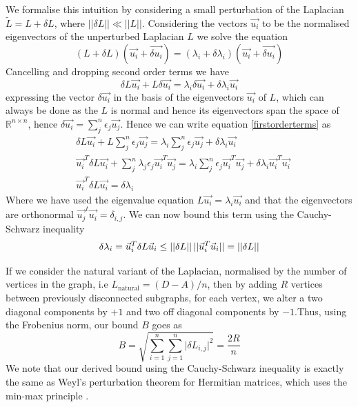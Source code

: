 \documentclass[letterpaper]{article} %
\begin{document}
We formalise this intuition by considering a small perturbation of the Laplacian $\tilde{L} = L +\delta L$, where $|| \delta L|| \ll ||L||$. Considering the vectors $\vec{u_{i}}$ to be the normalised eigenvectors of the unperturbed Laplacian $L$ we solve the equation
\begin{equation}
(L+\delta L)(\vec{u_{i}}+\vec{\delta u_{i}}) = (\lambda_{i}+\delta\lambda_{i})(\vec{u_{i}}+\vec{\delta u_{i}})
\end{equation}
Cancelling and dropping second order terms we have
\begin{equation}
\label{firstorderterms}
\delta L \vec{u_{i}} + L\delta\vec{u_{i}}= \lambda_{i}\delta\vec{u_{i}} + \delta \lambda_{i}\vec{u_{i}}
\end{equation}
expressing the vector $\delta\vec{u_{i}}$ in the basis of the eigenvectors $\vec{u_{i}}$ of $L$, which can always be done as the $L$ is normal and hence its eigenvectors span the space of $\mathbb{R}^{n \times n}$, hence $\delta\vec{u_{i}} = \sum_{j}^{n}\epsilon_{j}\vec{u_{j}}$. Hence we can write equation \eqref{firstorderterms} as 
\begin{align}
& \delta L \vec{u_{i}} + L\sum_{j}^{n}\epsilon_{j}\vec{u_{j}}= \lambda_{i}\sum_{j}^{n}\epsilon_{j}\vec{u_{j}} + \delta \lambda_{i}\vec{u_{i}} \nonumber\\ 
& \vec{u_{i}}^{T}\delta L \vec{u_{i}} + \sum_{j}^{n}\lambda_{j}\epsilon_{j}\vec{u_{i}}^{T}\vec{u_{j}}= \lambda_{i}\sum_{j}^{n}\epsilon_{j}\vec{u_{i}}^{T}\vec{u_{j}} + \delta \lambda_{i}\vec{u_{i}}^{T}\vec{u_{i}}\nonumber\\
& \vec{u_{i}}^{T} \delta L \vec{u_{i}} = \delta \lambda_{i}
\end{align}
Where we have used the eigenvalue equation $L\vec{u_{i}} = \lambda_{i}\vec{u_{i}}$ and that the eigenvectors are orthonormal $\vec{u_{j}}^{t}\vec{u_{i}} = \delta_{i,j}$. We can now bound this term using the Cauchy-Schwarz inequality
\begin{equation}
\label{cauchyschwarz}
\delta \lambda_{i} =  \vec{u}_{i}^{T}\delta L \vec{u}_{i} \leq ||\delta L||\thinspace|| \vec{u}_{i}^{T}\vec{u}_{i}|| = ||\delta L||
\end{equation}

If we consider the natural variant of the Laplacian, normalised by the number of vertices in the graph, i.e $L_\mathrm{natural} = (D-A)/n$, then by adding $R$ vertices between previously disconnected subgraphs, for each vertex, we alter a two diagonal components by $+1$ and two off diagonal components by $-1$.Thus, using the Frobenius norm, our bound $B$ goes as
\begin{equation}
B = \sqrt{\sum_{i=1}^{n}\sum_{j=1}^{n}\bigg|\delta L_{i,j}\bigg|^{2}} = \frac{2R}{n}
\end{equation}
We note that our derived bound using the Cauchy-Schwarz inequality is exactly the same as Weyl's perturbation theorem for Hermitian matrices, which uses the min-max principle \citep{bhatia2013matrix}.
\end{document}
